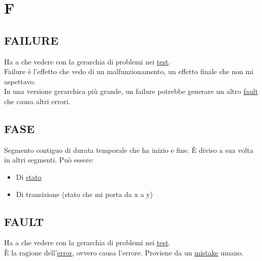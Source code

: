 \newpage
	\section{F} \label{sec:F}

		\subsection{FAILURE}		\label{failure}	%
		Ha a che vedere con la gerarchia di problemi nei \underline{\hyperref[test]{test}}. \\
		Failure è l'effetto che vedo di un malfunzionamento, un effetto finale che non mi aspettavo. \\
		In una versione gerarchica più grande, un failure potrebbe generare un altro \underline{\hyperref[fault]{fault}} che causa altri errori. %

		\subsection{FASE}  \label{fase}
		Segmento contiguo di durata temporale che ha inizio e fine. È diviso a sua volta in altri segmenti. Può essere:
		\begin{itemize}
			\item Di \underline{\hyperref[stato]{stato}}
			\item Di transizione (stato che mi porta da x a y)
		\end{itemize}

		\subsection{FAULT}		\label{fault}
		Ha a che vedere con la gerarchia di problemi nei \underline{\hyperref[test]{test}}. \\
		È la ragione dell'\underline{\hyperref[error]{error}}, ovvero causa l'errore. Proviene da un \underline{\hyperref[mistake]{mistake}} umano.
